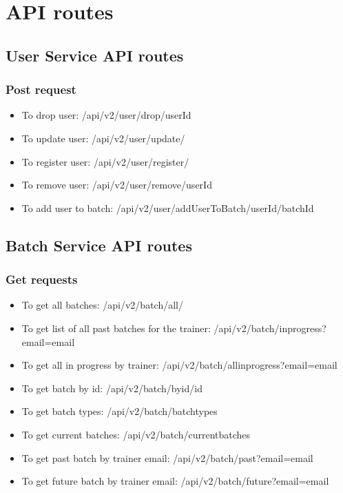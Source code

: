 \chapter{API routes}
\section{User Service API routes}
\subsection{Post request}
\begin{itemize}
  \item To drop user: /api/v2/user/drop/{userId}
  \item To update user: /api/v2/user/update/
  \item To register user: /api/v2/user/register/
  \item To remove user: /api/v2/user/remove/{userId}
  \item To add user to batch: /api/v2/user/addUserToBatch/{userId}/{batchId}
\end{itemize}

\section{Batch Service API routes}
\subsection{Get requests}
\begin{itemize}
  \item To get all batches: /api/v2/batch/all/
  \item To get list of all past batches for the trainer:   /api/v2/batch/inprogress?email={email}
  \item To get all in progress by trainer: /api/v2/batch/allinprogress?email={email}
  \item To get batch by id: /api/v2/batch/byid/{id}
  \item To get batch types: /api/v2/batch/batchtypes
  \item To get current batches: /api/v2/batch/currentbatches
  \item To get past batch by trainer email: /api/v2/batch/past?email={email}
  \item To get future batch by trainer email: /api/v2/batch/future?email={email}
\end{itemize}



